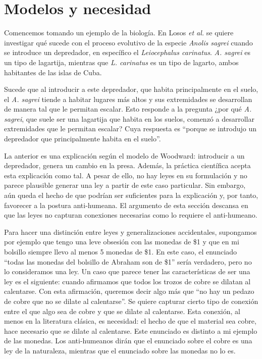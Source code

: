 \section{Modelos y necesidad}

\noindent Comencemos tomando un ejemplo de la biología. En Losos \emph{et al.}\citeyear{Losos2004} se quiere investigar qué sucede con el proceso evolutivo de la especie \textit{Anolis sagrei} cuando se introduce un depredador, en específico el \textit{Leiocephalus carinatus}. \textit{A. sagrei}  es un tipo de lagartija, mientras que \textit{L. carinatus} es un tipo de lagarto, ambos habitantes de las islas de Cuba.

Sucede que al introducir a este depredador, que habita principalmente en el suelo, el \textit{A. sagrei} tiende a habitar lugares más altos y sus extremidades se desarrollan de manera tal que le permitan escalar. Esto responde a la pregunta ¿por qué \textit{A. sagrei}, que suele ser una lagartija que habita en los suelos, comenzó a desarrollar extremidades que le permitan escalar? Cuya respuesta es ``porque se introdujo un depredador que principalmente habita en el suelo''.

La anterior es una explicación según el modelo de Woodward: introducir a un depredador, genera un cambio en la presa. Además, la práctica científica acepta esta explicación como tal. A pesar de ello, no hay leyes en su formulación y no parece plausible generar una ley a partir de este caso particular. Sin embargo, aún queda el hecho de que podrían ser suficientes para la explicación y, por tanto, favorecer a la postura anti-humeana. El argumento de esta sección descansa en que las leyes no capturan conexiones necesarias como lo requiere el anti-humeano.

Para hacer una distinción entre leyes y generalizaciones accidentales, supongamos por ejemplo que tengo una leve obsesión con las monedas de \$1 y que en mi bolsillo siempre llevo al menos 5 monedas de \$1. En este caso, el enunciado ``todas las monedas del bolsillo de Abraham son de \$1'' sería verdadero, pero no lo consideramos una ley. Un caso que parece tener las características de ser una ley es el siguiente: cuando afirmamos que todos los trozos de cobre se dilatan al calentarse.  Con esta afirmación, queremos decir algo más que ``no hay un pedazo de cobre que no se dilate al calentarse''. Se quiere capturar cierto tipo de conexión entre el que algo sea de cobre y que se dilate al calentarse. Esta conexión, al menos en la literatura clásica, es necesidad: el hecho de que el material sea cobre, hace necesario que se dilate al calentarse. Este enunciado es distinto a mi ejemplo de las monedas. Los anti-humeanos dirán que el enunciado sobre el cobre es una ley de la naturaleza, mientras que el enunciado sobre las monedas no lo es.

